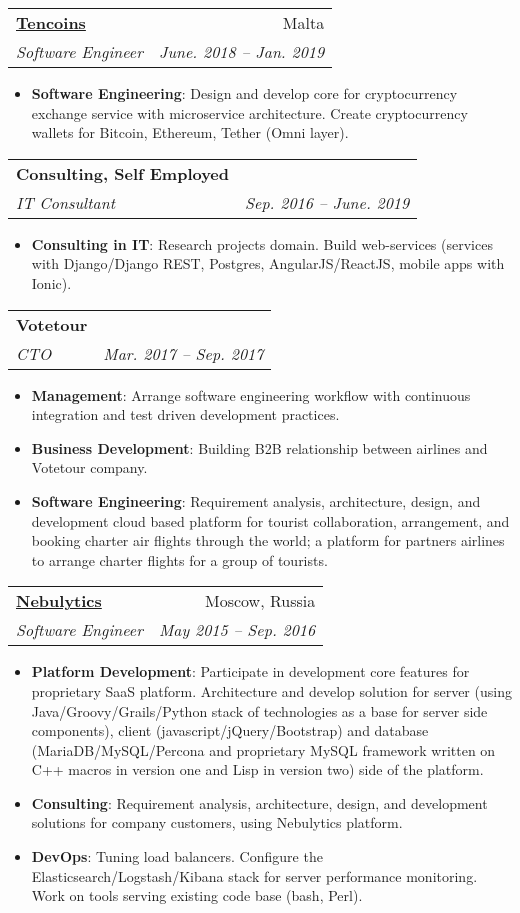 \documentclass[letterpaper,11pt]{article}
\makeatletter
\newcommand{\resumeItem}[2]{
  \item\small{
    \textbf{#1}{: #2 \vspace{-2pt}}
  }
}
\newcommand{\resumeSubheading}[4]{
  \vspace{-1pt}\item
    \begin{tabular*}{0.97\textwidth}{l@{\extracolsep{\fill}}r}
      \textbf{#1} & #2 \\
      \textit{\small#3} & \textit{\small #4} \\
    \end{tabular*}\vspace{-5pt}
}
\newcommand{\resumeItemListStart}{\begin{itemize}}
\newcommand{\resumeItemListEnd}{\end{itemize}\vspace{-5pt}}
\makeatother
\begin{document}
   \resumeSubheading
      {\href{https://tencoins.org}{Tencoins}}{Malta}
      {Software Engineer}{June. 2018 -- Jan. 2019}
      \resumeItemListStart
        \resumeItem{Software Engineering}
          {Design and develop core for cryptocurrency exchange service with microservice architecture. Create cryptocurrency wallets for Bitcoin, Ethereum, Tether (Omni layer).}
    \resumeItemListEnd

    \resumeSubheading
      {Consulting, Self Employed}{}
      {IT Consultant}{Sep. 2016 -- June. 2019}
      \resumeItemListStart
        \resumeItem{Consulting in IT}
          {Research projects domain. Build web-services (services with Django/Django REST, Postgres, AngularJS/ReactJS, mobile apps with Ionic).}
    \resumeItemListEnd

    \resumeSubheading
      {Votetour}{}
      {CTO}{Mar. 2017 -- Sep. 2017}
      \resumeItemListStart
        \resumeItem{Management}
          {Arrange software engineering workflow with continuous integration and test driven development practices.}
        \resumeItem{Business Development}
          {Building B2B relationship between airlines and Votetour company.}
        \resumeItem{Software Engineering}
          {Requirement analysis, architecture, design, and development cloud based platform for tourist collaboration, arrangement, and booking charter air flights through the world; a platform for partners airlines to arrange charter flights for a group of tourists.}
    \resumeItemListEnd

    \resumeSubheading
      {\href{http://nebulytics.com}{Nebulytics}}{Moscow, Russia}
      {Software Engineer}{May 2015 -- Sep. 2016}
      \resumeItemListStart
        \resumeItem{Platform Development}
          {Participate in development core features for proprietary SaaS platform. Architecture and develop solution for server (using Java/Groovy/Grails/Python stack of technologies as a base for server side components), client (javascript/jQuery/Bootstrap) and database (MariaDB/MySQL/Percona and proprietary MySQL framework written on C++ macros in version one and Lisp in version two) side of the platform.}
        \resumeItem{Consulting}
          {Requirement analysis, architecture, design, and development solutions for company customers, using Nebulytics platform.}
        \resumeItem{DevOps}
          {Tuning load balancers. Configure the Elasticsearch/Logstash/Kibana stack for server performance monitoring. Work on tools serving existing code base (bash, Perl).}
      \resumeItemListEnd
\end{document}

